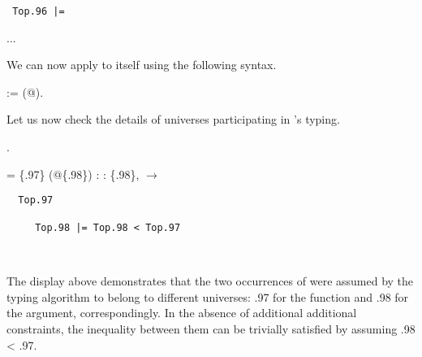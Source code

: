 \coqdocemptyline

\texttt{\coqcl~Top.96 |= ~\coqcr}



\coqdoceol
\coqdocemptyline
\coqdocnoindent
{}   \coqdoceol
\coqdocnoindent
{}      \coqdoceol
\coqdocnoindent
...

\coqdocemptyline


We can now apply  to itself using the following syntax.
\begin{coqdoccode}
\coqdocemptyline
\coqdocnoindent
{}  :=  (@).\coqdoceol
\coqdocemptyline
\end{coqdoccode}
\coqdoceol
\coqdocemptyline
\coqdocnoindent
{}  

\coqdocemptyline


Let us now check the details of universes participating in
's typing.


\begin{coqdoccode}
\coqdocemptyline
\coqdocnoindent
{} .\coqdoceol
\coqdocemptyline
\end{coqdoccode}
\coqdoceol
\coqdocemptyline
\coqdocnoindent
{} = \coqdoceol
\coqdocnoindent
{}\{.97\} (@\{.98\})\coqdoceol
\coqdocindent{2.50em}
: \coqdockw{\ensuremath{\forall}}  : \{.98\},  \ensuremath{\rightarrow} 

\coqdocemptyline
 
\texttt{\coqcl ~ Top.97}

~~~~\texttt{   Top.98 |= Top.98 < Top.97}

~~~~~\texttt{~\coqcr}



The display above demonstrates that the two occurrences of 
were assumed by the typing algorithm to belong to different universes:
.97 for the function and .98 for the argument,
correspondingly. In the absence of additional additional constraints,
the inequality between them can be trivially satisfied by assuming
.98 < .97.


\begin{coqdoccode}
\coqdocemptyline
\coqdocemptyline
\coqdocemptyline
\end{coqdoccode}
